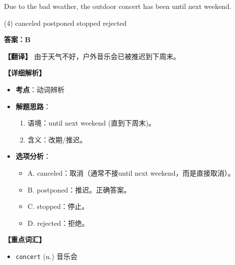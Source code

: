 \documentclass[11pt, a4paper]{article}
\newcommand{\analysis}[4]{
    \begin{solutionbox}
        \textbf{答案：#1}
        
        \textbf{【翻译】} #2
        
        \textbf{【详细解析】}
        #3
        
        \textbf{【重点词汇】}
        #4
    \end{solutionbox}
}
\newcommand{\blank}{\underline{\hspace{1.5cm}}}
\begin{document}
\begin{questions}
    \item Due to the bad weather, the outdoor concert has been \blank until next weekend.
    \begin{tasks}(4)
        \task canceled \task postponed \task stopped \task rejected
    \end{tasks}
    \analysis{B}{由于天气不好，户外音乐会已被推迟到下周末。}{
        \begin{itemize}
            \item \textbf{考点}：动词辨析
            \item \textbf{解题思路}：
                \begin{enumerate}
                    \item 语境：until next weekend (直到下周末)。
                    \item 含义：改期/推迟。
                \end{enumerate}
            \item \textbf{选项分析}：
                \begin{itemize}
                    \item A. canceled：取消（通常不接until next weekend，而是直接取消）。
                    \item B. postponed：推迟。正确答案。
                    \item C. stopped：停止。
                    \item D. rejected：拒绝。
                \end{itemize}
        \end{itemize}
    }{
        \begin{itemize}
            \item \texttt{concert} (n.) 音乐会
        \end{itemize}
    }
\end{questions}

\end{document}
